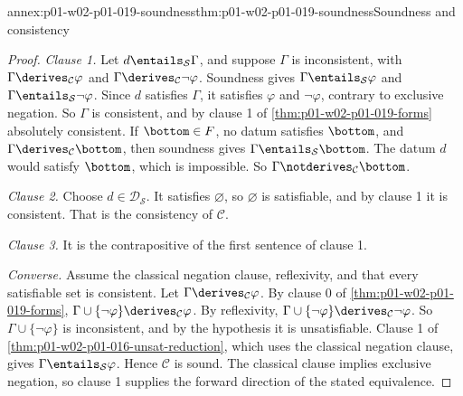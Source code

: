 \begin{annexitem}{annex:p01-w02-p01-019-soundness}{thm:p01-w02-p01-019-soundness}{Soundness and consistency}
\begin{proof}
\emph{Clause 1.} Let \(d\entails_{\mathcal S}\Gamma\), and suppose \(\Gamma\)
is inconsistent, with \(\Gamma\derives_{\mathcal C}\varphi\) and
\(\Gamma\derives_{\mathcal C}\neg\varphi\). Soundness gives
\(\Gamma\entails_{\mathcal S}\varphi\) and
\(\Gamma\entails_{\mathcal S}\neg\varphi\). Since \(d\) satisfies \(\Gamma\),
it satisfies \(\varphi\) and \(\neg\varphi\), contrary to exclusive negation.
So \(\Gamma\) is consistent, and by clause 1 of
\cref{thm:p01-w02-p01-019-forms} absolutely consistent. If \(\bottom\in F\),
no datum satisfies \(\bottom\), and \(\Gamma\derives_{\mathcal C}\bottom\),
then soundness gives \(\Gamma\entails_{\mathcal S}\bottom\). The datum \(d\)
would satisfy \(\bottom\), which is impossible. So
\(\Gamma\notderives_{\mathcal C}\bottom\).

\emph{Clause 2.} Choose \(d\in\mathcal D_{\mathcal S}\). It satisfies
\(\varnothing\), so \(\varnothing\) is satisfiable, and by clause 1 it is
consistent. That is the consistency of \(\mathcal C\).

\emph{Clause 3.} It is the contrapositive of the first sentence of clause 1.

\emph{Converse.} Assume the classical negation clause, reflexivity, and that
every satisfiable set is consistent. Let \(\Gamma\derives_{\mathcal C}\varphi\).
By clause 0 of \cref{thm:p01-w02-p01-019-forms},
\(\Gamma\cup\{\neg\varphi\}\derives_{\mathcal C}\varphi\). By reflexivity,
\(\Gamma\cup\{\neg\varphi\}\derives_{\mathcal C}\neg\varphi\). So
\(\Gamma\cup\{\neg\varphi\}\) is inconsistent, and by the hypothesis it is
unsatisfiable. Clause 1 of \cref{thm:p01-w02-p01-016-unsat-reduction}, which
uses the classical negation clause, gives \(\Gamma\entails_{\mathcal S}\varphi\).
Hence \(\mathcal C\) is sound. The classical clause implies exclusive
negation, so clause 1 supplies the forward direction of the stated
equivalence.
\end{proof}
\end{annexitem}

